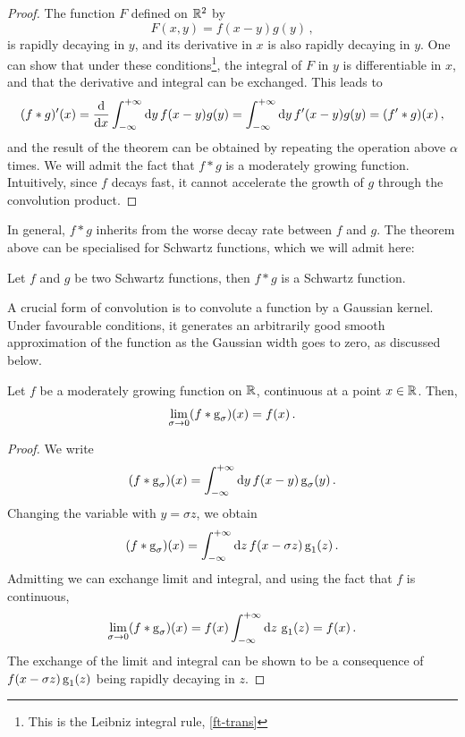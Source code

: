 \begin{proof}
	The function $F$ defined on $\mathbb{R}^2$ by
	\begin{equation}
		F(x,y)=f(x-y)g(y)\,,
	\end{equation}
	is rapidly decaying in $y$, and its derivative in $x$ is also rapidly decaying in $y$.
	One can show that under these conditions\footnote{This is the Leibniz integral rule,
		\cf\cref{ft-trans}}, the integral of $F$ in $y$ is differentiable in $x$, and that the
	derivative and integral can be exchanged. This leads to
	\begin{equation}
		(f\ast g)'(x)=\frac{\mathrm{d}}{\mathrm{d} x}\int_{-\infty}^{+\infty}\mathrm{d}{y}\,f(x-y)g(y)
		=\int_{-\infty}^{+\infty}\mathrm{d}{y}\,f'(x-y)g(y)=(f'\ast g)(x)\,,
	\end{equation}
	and the result of the theorem can be obtained by repeating the operation above $\alpha$
	times. We will admit the fact that $f\ast g$ is a moderately growing function.
	Intuitively, since $f$ decays fast, it cannot accelerate the growth of $g$ through the
	convolution product.
\end{proof}
In general, $f\ast g$ inherits from the worse decay rate between $f$ and $g$. The theorem
above can be specialised for Schwartz functions, which we will admit here:
\begin{proposition}
	Let $f$ and $g$ be two Schwartz functions, then $f\ast g$ is a Schwartz function.
\end{proposition}
A crucial form of convolution is to convolute a function by a Gaussian kernel. Under
favourable conditions, it generates an arbitrarily good smooth approximation of the
function as the Gaussian width goes to zero, as discussed below.
\begin{theorem}
	\label{thm:gaussian-unit}
	Let $f$ be a moderately growing function on $\mathbb{R}$, continuous at a point $x\in\mathbb{R}$. Then,
	\begin{equation}
		\lim_{\sigma\to 0}(f\ast \operatorname{g}_{\sigma})(x)=f(x)\,.
	\end{equation}
\end{theorem}
\begin{proof}
	We write
	\begin{equation}
		(f\ast \operatorname{g}_{\sigma})(x)=\int_{-\infty}^{+\infty}\mathrm{d}{y}\,f(x-y)\operatorname{g}_{\sigma}(y)\,.
	\end{equation}
	Changing the variable with $y=\sigma z$, we obtain
	\begin{equation}
		(f\ast \operatorname{g}_{\sigma})(x)=\int_{-\infty}^{+\infty}\mathrm{d}{z}\,f(x-\sigma z)\operatorname{g}_{1}(z)\,.
	\end{equation}
	Admitting we can exchange limit and integral, and using the fact that $f$ is continuous,
	\begin{equation}
		\lim_{\sigma\to 0}(f\ast \operatorname{g}_{\sigma})(x)=f(x)\int_{-\infty}^{+\infty}\mathrm{d}{z}\,\operatorname{g}_{1}(z)=f(x)\,.
	\end{equation}
	The exchange of the limit and integral can be shown to be a consequence of $f(x-\sigma
		z)\operatorname{g}_{1}(z)$ being rapidly decaying in $z$.
\end{proof}
